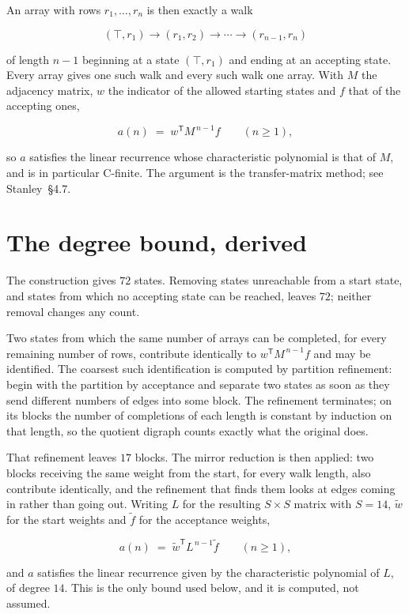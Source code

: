 \documentclass[11pt]{article}
\theoremstyle{definition}
\begin{document}
An array with rows $r_1,\dots,r_n$ is then exactly a walk

\[(\top,r_1) \to (r_1,r_2) \to \cdots \to (r_{n-1},r_n)\]

of length $n-1$ beginning at a state $(\top,r_1)$ and ending at an accepting state. Every array gives one such walk and every such walk one array. With $M$ the adjacency matrix, $w$ the indicator of the allowed starting states and $f$ that of the accepting ones,

\[a(n) \;=\; w^{\mathsf T} M^{\,n-1} f \qquad (n \ge 1),\]

so $a$ satisfies the linear recurrence whose characteristic polynomial is that of $M$, and is in particular C-finite. The argument is the transfer-matrix method; see Stanley~\S4.7.

\section{The degree bound, derived}

The construction gives $72$ states. Removing states unreachable from a start state, and states from which no accepting state can be reached, leaves $72$; neither removal changes any count.

Two states from which the same number of arrays can be completed, for every remaining number of rows, contribute identically to $w^{\mathsf T}M^{\,n-1}f$ and may be identified. The coarsest such identification is computed by partition refinement: begin with the partition by acceptance and separate two states as soon as they send different numbers of edges into some block. The refinement terminates; on its blocks the number of completions of each length is constant by induction on that length, so the quotient digraph counts exactly what the original does.

That refinement leaves $17$ blocks. The mirror reduction is then applied: two blocks receiving the same weight from the start, for every walk length, also contribute identically, and the refinement that finds them looks at edges coming in rather than going out. Writing $L$ for the resulting $S \times S$ matrix with $S = 14$, $\tilde w$ for the start weights and $\tilde f$ for the acceptance weights,

\[a(n) \;=\; \tilde w^{\mathsf T} L^{\,n-1} \tilde f \qquad (n \ge 1),\]

and $a$ satisfies the linear recurrence given by the characteristic polynomial of $L$, of degree $14$. This is the only bound used below, and it is computed, not assumed.
\end{document}
